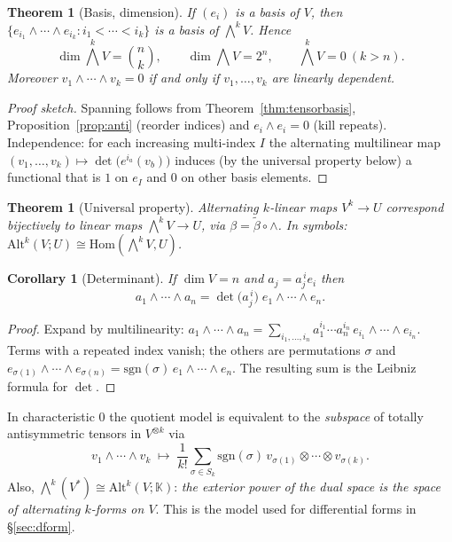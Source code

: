 \documentclass[11pt,a4paper]{article}
\newcounter{thm}[section]
\numberwithin{equation}{section}
\theoremstyle{definition}
\theoremstyle{plain}
\newtheorem{theorem}[thm]{Theorem}
\newtheorem{corollary}[thm]{Corollary}
\newcommand{\K}{\mathbb{K}}
\newcommand{\sgn}{\mathrm{sgn}}
\newcommand{\Hom}{\mathrm{Hom}}
\newcommand{\Alt}{\mathrm{Alt}}                    %
\begin{document}
\begin{theorem}[Basis, dimension]\label{thm:extbasis}
If $(e_i)$ is a basis of $V$, then $\{e_{i_1}\wedge\cdots\wedge e_{i_k}: i_1<\cdots<i_k\}$ is a basis of $\bigwedge^kV$. Hence
\[
 \dim\textstyle\bigwedge^kV=\binom nk,\qquad\dim\bigwedge V=2^n,\qquad \bigwedge^kV=0\ (k>n).
\]
Moreover $v_1\wedge\cdots\wedge v_k=0$ if and only if $v_1,\dots,v_k$ are linearly dependent.
\end{theorem}
\begin{proof}[Proof sketch]
Spanning follows from Theorem~\ref{thm:tensorbasis}, Proposition~\ref{prop:anti} (reorder indices) and $e_i\wedge e_i=0$ (kill repeats).
Independence: for each increasing multi-index $I$ the alternating multilinear map $(v_1,\dots,v_k)\mapsto\det\bigl(e^{i_a}(v_b)\bigr)$ induces (by
the universal property below) a functional that is $1$ on $e_I$ and $0$ on other basis elements.
\end{proof}

\begin{theorem}[Universal property]\label{thm:extuniv}
Alternating $k$-linear maps $V^k\to U$ correspond bijectively to linear maps $\bigwedge^kV\to U$,
via $\beta=\tilde\beta\circ\wedge$. In symbols: $\Alt^k(V;U)\cong\Hom(\bigwedge^kV,U)$.
\end{theorem}

\begin{corollary}[Determinant]\label{cor:det}
If $\dim V=n$ and $a_j=a_j^{\,i}e_i$ then
\[
 a_1\wedge\cdots\wedge a_n=\det\bigl(a_j^{\,i}\bigr)\;e_1\wedge\cdots\wedge e_n .
\]
\end{corollary}
\begin{proof}
Expand by multilinearity: $a_1\wedge\cdots\wedge a_n=\sum_{i_1,\dots,i_n}a_1^{i_1}\cdots a_n^{i_n}\,e_{i_1}\wedge\cdots\wedge e_{i_n}$.
Terms with a repeated index vanish; the others are permutations $\sigma$ and $e_{\sigma(1)}\wedge\cdots\wedge e_{\sigma(n)}=\sgn(\sigma)\,e_1\wedge\cdots\wedge e_n$. The resulting sum is the Leibniz formula for $\det$.
\end{proof}

\begin{remark}\label{rem:twomodels}
In characteristic $0$ the quotient model is equivalent to the \emph{subspace} of totally antisymmetric tensors in $V^{\otimes k}$ via
\[
 v_1\wedge\cdots\wedge v_k\;\longmapsto\;\frac1{k!}\sum_{\sigma\in S_k}\sgn(\sigma)\,v_{\sigma(1)}\otimes\cdots\otimes v_{\sigma(k)} .
\]
Also, $\bigwedge^k(V^*)\cong\Alt^k(V;\K)$: \emph{the exterior power of the dual space is the space of alternating $k$-forms on $V$}. This is the model used for differential forms in \S\ref{sec:dform}.
\end{remark}
\end{document}
